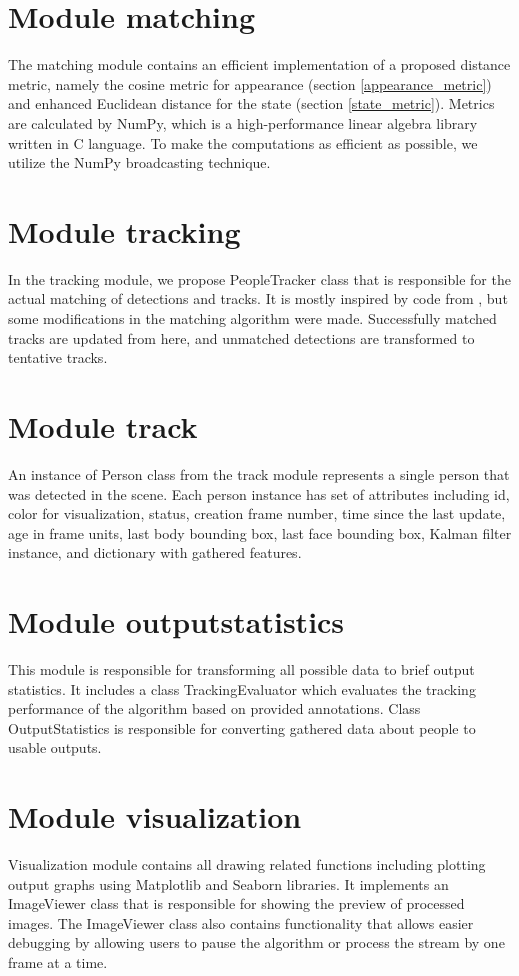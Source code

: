 \section{Module matching}
    The matching module contains an efficient implementation of a proposed distance metric, namely the cosine metric for appearance (section \ref{appearance_metric}) and enhanced Euclidean distance for the state (section \ref{state_metric}). Metrics are calculated by NumPy, which is a high-performance linear algebra library written in C language. To make the computations as efficient as possible, we utilize the NumPy broadcasting technique.

\section{Module tracking}
    In the tracking module, we propose PeopleTracker class that is responsible for the actual matching of detections and tracks. It is mostly inspired by code from \cite{wojke2017simple}, but some modifications in the matching algorithm were made. Successfully matched tracks are updated from here, and unmatched detections are transformed to tentative tracks.
    
\section{Module track}
    An instance of Person class from the track module represents a single person that was detected in the scene. Each person instance has set of attributes including id, color for visualization, status, creation frame number, time since the last update, age in frame units, last body bounding box, last face bounding box, Kalman filter instance, and dictionary with gathered features.
    
\section{Module output\textunderscore statistics}
    This module is responsible for transforming all possible data to brief output statistics. It includes a class TrackingEvaluator which evaluates the tracking performance of the algorithm based on provided annotations. Class OutputStatistics is responsible for converting gathered data about people to usable outputs.

\section{Module visualization}
    Visualization module contains all drawing related functions including plotting output graphs using Matplotlib and Seaborn libraries. It implements an ImageViewer class that is responsible for showing the preview of processed images. The ImageViewer class also contains functionality that allows easier debugging by allowing users to pause the algorithm or process the stream by one frame at a time.